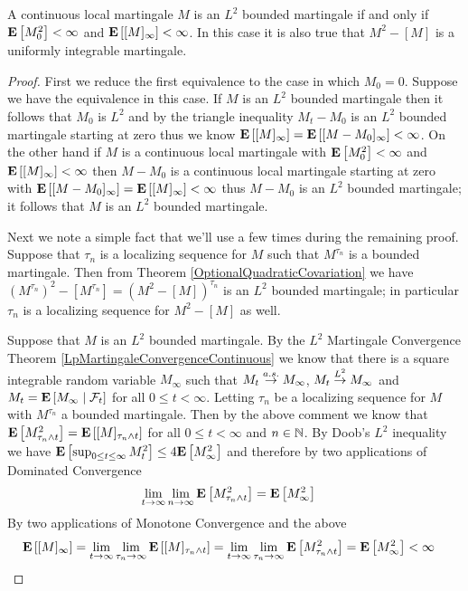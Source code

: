 \begin{prop}\label{OptionalQuadraticCovariationL2BoundedMartingale}A continuous local martingale $M$ is an $L^2$ bounded martingale if and only if $\expectation{M_0^2} < \infty$ and $\expectation{[M]_\infty} < \infty$.  In this case it is also true that $M^2 - [M]$ is a uniformly integrable martingale.
\end{prop}
\begin{proof}
First we reduce the first equivalence to the case in which $M_0=0$.  Suppose we have the equivalence in this case. If $M$ is an $L^2$ bounded martingale then it follows that $M_0$ is $L^2$ and by the triangle inequality $M_t - M_0$ is an $L^2$ bounded martingale starting at zero thus we know $\expectation{[M]_\infty}= \expectation{[M-M_0]_\infty} < \infty$.  On the other hand if $M$ is a continuous local martingale with $\expectation{M_0^2} < \infty$ and $\expectation{[M]_\infty}<\infty$ then $M-M_0$ is a continuous local martingale starting at zero with $\expectation{[M-M_0]_\infty} = \expectation{[M]_\infty}<\infty$ thus $M-M_0$ is an $L^2$ bounded martingale; it follows that $M$ is an $L^2$ bounded martingale.

Next we note a simple fact that we'll use a few times during the remaining proof.  Suppose that $\tau_n$ is a localizing sequence for $M$ such that $M^{\tau_n}$ is a bounded martingale.  Then from Theorem \ref{OptionalQuadraticCovariation} we have $(M^{\tau_n})^2 - [M^{\tau_n}] = (M^2 - [M])^{\tau_n}$ is an $L^2$ bounded martingale; in particular $\tau_n$ is a localizing sequence for $M^2 - [M]$ as well.


Suppose that $M$ is an $L^2$ bounded martingale.  By the $L^2$ Martingale Convergence Theorem \ref{LpMartingaleConvergenceContinuous} we know that there is a square integrable random variable $M_\infty$ such that $M_t \toas M_\infty$, $M_t \tolp{2} M_\infty$ and $M_t = \cexpectationlong{\mathcal{F}_t}{M_\infty}$ for all $0 \leq t < \infty$.  Letting $\tau_n$ be a localizing sequence for $M$ with $M^{\tau_n}$ a bounded martingale.  Then by the above comment we know that $\expectation{M^2_{\tau_n \wedge t}} = \expectation{[M]_{\tau_n \wedge t}}$ for all $0 \leq t < \infty$ and $n \in \naturals$.  By Doob's $L^2$ inequality we have $\expectation{\sup_{0 \leq t \leq \infty} M_t^2} \leq 4 \expectation{M^2_\infty}$ and therefore by two applications of Dominated Convergence
\begin{align*}
\lim_{t \to \infty} \lim_{n \to \infty} \expectation{M^2_{\tau_n \wedge t}} &= \expectation{M^2_\infty}
\end{align*}
By two applications of Monotone Convergence and the above
\begin{align*}
\expectation{[M]_{\infty}} &=\lim_{t \to \infty} \lim_{\tau_n \to \infty} \expectation{[M]_{\tau_n \wedge t}} = \lim_{t \to \infty} \lim_{\tau_n \to \infty} \expectation{M^2_{\tau_n \wedge t}}
=\expectation{M^2_\infty} < \infty
\end{align*}


\end{proof}
